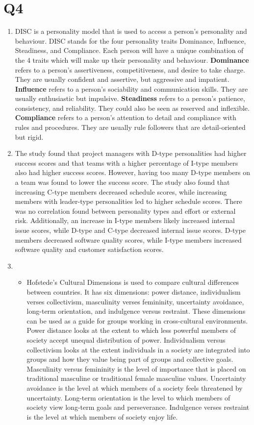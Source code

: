 \documentclass[12pt, letterpaper, titlepage]{article}
\begin{document}
\section*{Q4}
\begin{enumerate}
    \item DISC is a personality model that is used to access a person's personality and behaviour. DISC stands for the four personality traits Dominance, Influence, Steadiness, and Compliance. Each person will have a unique combination of the 4 traits which will make up their personality and behaviour. \textbf{Dominance} refers to a person's assertiveness, competitiveness, and desire to take charge. They are usually confident and assertive, but aggressive and impatient. \textbf{Influence} refers to a person's sociability and communication skills. They are usually enthusiastic but impulsive. \textbf{Steadiness} refers to a person's patience, consistency, and reliability. They could also be seen as reserved and inflexible. \textbf{Compliance} refers to a person's attention to detail and compliance with rules and procedures. They are usually rule followers that are detail-oriented but rigid.
    \item The study found that project managers with D-type personalities had higher success scores and that teams with a higher percentage of I-type members also had higher success scores. However, having too many D-type members on a team was found to lower the success score. The study also found that increasing C-type members decreased schedule scores, while increasing members with leader-type personalities led to higher schedule scores. There was no correlation found between personality types and effort or external risk. Additionally, an increase in I-type members likely increased internal issue scores, while D-type and C-type decreased internal issue scores. D-type members decreased software quality scores, while I-type members increased software quality and customer satisfaction scores.
    \item 
    \begin{itemize}
        \item Hofstede's Cultural Dimensions is used to compare cultural differences between countries. It has six dimensions: power distance, individualism verses collectivism, masculinity verses femininity, uncertainty avoidance, long-term orientation, and indulgence versus restraint. These dimensions can be used as a guide for groups working in cross-cultural environments. Power distance looks at the extent to which less powerful members of society accept unequal distribution of power. Individualism versus collectivism looks at the extent individuals in a society are integrated into groups and how they value being part of groups and collective goals. Masculinity versus femininity is the level of importance that is placed on traditional masculine or traditional female masculine values. Uncertainty avoidance is the level at which members of a society feels threatened by uncertainty. Long-term orientation is the level to which members of society view long-term goals and perseverance. Indulgence verses restraint is the level at which members of society enjoy life. 

\end{itemize}
\end{enumerate}
\end{document}
